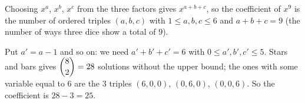 Choosing $x^a$, $x^b$, $x^c$ from the three factors gives $x^{a+b+c}$, so the coefficient of $x^9$ is the number of ordered triples $(a,b,c)$ with $1\le a,b,c\le6$ and $a+b+c=9$ (the number of ways three dice show a total of $9$).

Put $a'=a-1$ and so on: we need $a'+b'+c'=6$ with $0\le a',b',c'\le5$. Stars and bars gives $\dbinom{8}{2}=28$ solutions without the upper bound; the ones with some variable equal to $6$ are the $3$ triples $(6,0,0)$, $(0,6,0)$, $(0,0,6)$. So the coefficient is $28-3=\boxed{25}$.
